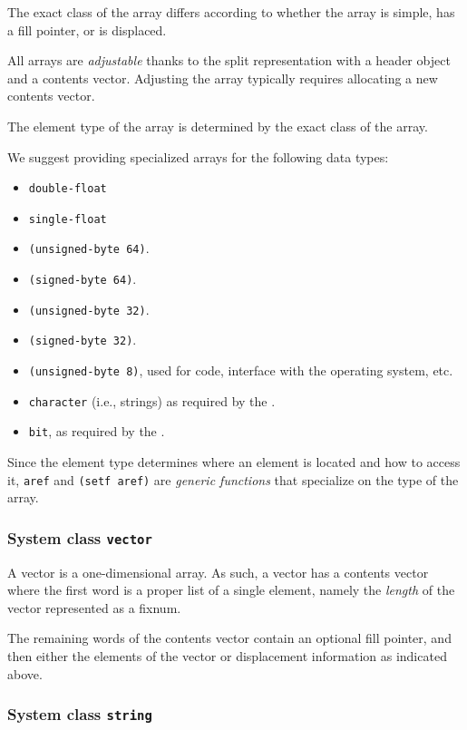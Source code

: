 The exact class of the array differs according to whether the array is
simple, has a fill pointer, or is displaced. 

All arrays are \emph{adjustable} thanks to the split representation
with a header object and a contents vector.  Adjusting the array
typically requires allocating a new contents vector. 

The element type of the array is determined by the exact class of the
array. 

We suggest providing specialized arrays for the following data types:

\begin{itemize}
\item \texttt{double-float}
\item \texttt{single-float}
\item \texttt{(unsigned-byte 64)}.
\item \texttt{(signed-byte 64)}.
\item \texttt{(unsigned-byte 32)}.
\item \texttt{(signed-byte 32)}.  
\item \texttt{(unsigned-byte 8)}, used for code, interface with the
  operating system, etc. 
\item \texttt{character} (i.e., strings) as required by the \hs{}.
\item \texttt{bit}, as required by the \hs{}.
\end{itemize}

Since the element type determines where an element is located and how
to access it, \texttt{aref} and \texttt{(setf aref)} are \emph{generic
  functions} that specialize on the type of the array. 

\subsubsection{System class \texttt{vector}}

A vector is a one-dimensional array.  As such, a vector has a contents
vector where the first word is a proper list of a single element,
namely the \emph{length} of the vector represented as a fixnum. 

The remaining words of the contents vector contain an optional fill
pointer, and then either the elements of the vector or displacement
information as indicated above. 

\subsubsection{System class \texttt{string}}

